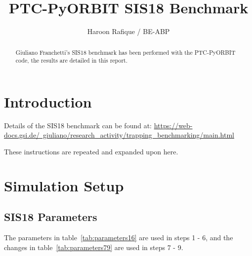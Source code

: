 \documentclass[a4paper]{cernatsnote}
\title{PTC-PyORBIT SIS18 Benchmark}
\author{Haroon Rafique / BE-ABP}
\def \gsiSISpage {\href{https://web-docs.gsi.de/~giuliano/research_activity/trapping_benchmarking/main.html}{https://web-docs.gsi.de/~giuliano/research\_activity/trapping\_benchmarking/main.html}}
\begin{document}
	
\maketitle %

\begin{abstract}
	Giuliano Franchetti's SIS18 benchmark has been performed with the PTC-PyORBIT code, the results are detailed in this report.
\end{abstract}

\section{Introduction}
\label{sec:intro}

Details of the SIS18 benchmark can be found at:
\gsiSISpage

These instructions are repeated and expanded upon here. 
	
\section{Simulation Setup}

\subsection{SIS18 Parameters}
The parameters in table~\ref{tab:parameters16} are used in steps 1 - 6, and the changes in table~\ref{tab:parameters79} are used in steps 7 - 9.
\end{document}
